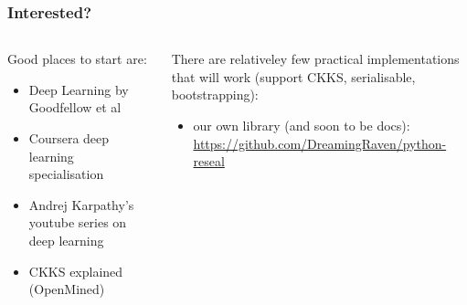 \documentclass[aspectratio=169]{beamer}
\begin{document}
  \begin{frame}
    \frametitle{Interested?}
    \begin{columns}
      \begin{column}{0.5\textwidth}
        Good places to start are:
        \begin{itemize}
            \item Deep Learning by Goodfellow et al \autocite{Goodfellow-et-al-2016}
            \item Coursera deep learning specialisation
            \item Andrej Karpathy's youtube series on deep learning \autocite{andrejkarpathy}
            \item CKKS explained (OpenMined) \autocite{openmined}
        \end{itemize}
      \end{column}
      \begin{column}{0.5\textwidth}
        There are relativeley few practical implementations that will work (support CKKS, serialisable, bootstrapping):
        \begin{itemize}
            \item our own library (and soon to be docs): \url{https://github.com/DreamingRaven/python-reseal}
        \end{itemize}
      \end{column}
    \end{columns}
  \end{frame}
\end{document}
